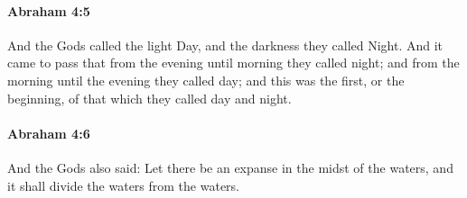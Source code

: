 
		\paragraph{Abraham 4:5} %
			\label{ABRAHAM-4-5}

			And the Gods called the light Day, and the darkness they called Night.  And it came to pass that from the evening until morning they called night; and from the morning until the evening they called day; and this was the first, or the beginning, of that which they called day and night.


		\paragraph{Abraham 4:6} %
			\label{ABRAHAM-4-6}

			And the Gods also said: Let there be an expanse in the midst of the waters, and it shall divide the waters from the waters.

